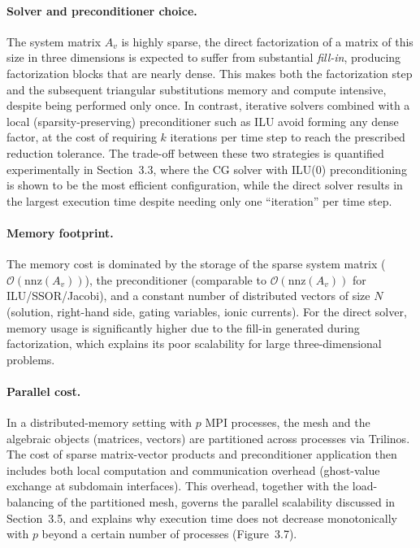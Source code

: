 \documentclass{Configuration_Files/PoliMi3i_thesis}
\begin{document}
\paragraph{Solver and preconditioner choice.}
The system matrix $A_v$ is highly sparse, the direct factorization of a
matrix of this size in three dimensions is expected to suffer from substantial
\emph{fill-in}, producing factorization blocks that are nearly dense. This makes both the
factorization step and the subsequent triangular substitutions memory and
compute intensive, despite being performed only once. In contrast, iterative solvers
combined with a local (sparsity-preserving) preconditioner such as ILU avoid forming any
dense factor, at the cost of requiring $k$ iterations per time step to reach the
prescribed reduction tolerance. The trade-off between these two strategies is quantified
experimentally in Section~3.3, where the CG solver with ILU(0) preconditioning is shown
to be the most efficient configuration, while the direct solver results in the largest
execution time despite needing only one ``iteration'' per time step.

\paragraph{Memory footprint.}
The memory cost is dominated by the storage of the sparse system matrix
($\mathcal{O}(\mathrm{nnz}(A_v))$), the preconditioner (comparable to
$\mathcal{O}(\mathrm{nnz}(A_v))$ for ILU/SSOR/Jacobi), and a constant number of
distributed vectors of size $N$ (solution, right-hand side, gating variables, ionic
currents). For the direct solver, memory usage is significantly higher due to the
fill-in generated during factorization, which explains its poor scalability for large
three-dimensional problems.

\paragraph{Parallel cost.}
In a distributed-memory setting with $p$ MPI processes, the mesh and the algebraic
objects (matrices, vectors) are partitioned across processes via Trilinos. The cost of
sparse matrix-vector products and preconditioner application then includes both local
computation and communication overhead (ghost-value exchange at subdomain interfaces).
This overhead, together with the load-balancing of the partitioned mesh, governs the
parallel scalability discussed in Section~3.5, and explains why execution time does not
decrease monotonically with $p$ beyond a certain number of processes (Figure~3.7).
\end{document}
